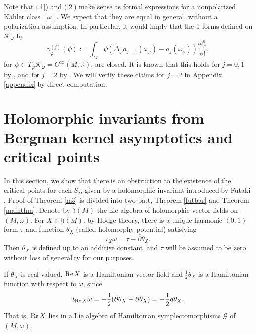 \documentclass[12pt,reqno,a4paper]{amsart}
\numberwithin{equation}{section}
\def\p{\partial}
\def\bp{\bar\partial}
\def\re{{\rm Re\,}}
\theoremstyle{remark}
\theoremstyle{dotless}
\begin{document}
Note that (\ref{1}) and (\ref{2}) make sense as formal expressions for a nonpolarized K\"ahler class $[\omega]$. We expect that they are equal in general, without a polarization assumption. In particular, it would imply that the 1-forms defined on $\mathcal{K}_\omega$ by
\begin{equation}\label{1forms}
\gamma^{(j)}_{\varphi}(\psi):=\int_M \psi(\Delta_\varphi a_{j-1}(\omega_\varphi)-a_{j}(\omega_\varphi))\frac{\omega_\varphi^n}{n!},
\end{equation}
for $\psi\in T_{\varphi}\mathcal{K}_\omega=C^{\infty}(M,\mathbb{R})$, are closed. It is known that this holds for $j=0,1$ by \cite{mabuchi1986k}, and for $j=2$ by \cite{bando1986some,chen2002ricci}. We will verify these claims for $j=2$ in Appendix \ref{appendix} by direct computation.

\section{Holomorphic invariants from Bergman kernel asymptotics and critical points}\label{sectionFutaki}

In this section, we show that there is an obstruction to the existence of the critical points for each $S_j$, given by a holomorphic invariant introduced by Futaki \cite{futaki2004asymptotic}. Proof of Theorem \ref{m3} is divided into two part, Theorem \ref{futbar} and Theorem \ref{mainthm}. Denote by $\mathfrak{h}(M)$ the Lie algebra of holomorphic vector fields on $(M,\omega)$. For $X\in\mathfrak{h}(M)$, by Hodge theory, there is a unique harmonic $(0,1)$-form $\tau$ and function $\theta_X$ (called holomorphy potential) satisfying
\begin{equation}\label{hamilton}
\iota_X \omega = \tau -\bp \theta_X.
\end{equation}
Then $\theta_X$ is defined up to an additive constant, and $\tau$ will be assumed to be zero without loss of generality for our purposes. 

If $\theta_X$ is real valued, $\re X$ is a Hamiltonian vector field and $\frac{1}{2}\theta_X$ is a Hamiltonian function with respect to $\omega$, since
\begin{equation*}
\iota_{\re X}\omega=-\frac{1}{2}(\bp \theta_X + \p \overline{\theta_X})=-\frac{1}{2}d\theta_X.
\end{equation*}
That is, $\re X$ lies in a Lie algebra of Hamiltonian symplectomorphisms $\mathcal{G}$ of $(M,\omega)$. 
\end{document}
